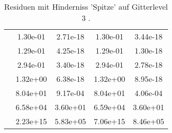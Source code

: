 \begin{table}
\begin{tabular}{c|cc|cc|}
\multicolumn{1}{|c|}{} & \multicolumn{1}{|c|}{  1.30e-01} & \multicolumn{1}{|c|}{  2.71e-18} & \multicolumn{1}{|c|}{  1.30e-01} & \multicolumn{1}{|c|}{  3.44e-18} \\ 
\multicolumn{1}{|c|}{} & \multicolumn{1}{|c|}{  1.29e-01} & \multicolumn{1}{|c|}{  4.25e-18} & \multicolumn{1}{|c|}{  1.29e-01} & \multicolumn{1}{|c|}{  1.30e-18} \\ 
\multicolumn{1}{|c|}{} & \multicolumn{1}{|c|}{  2.94e-01} & \multicolumn{1}{|c|}{  3.40e-18} & \multicolumn{1}{|c|}{  2.94e-01} & \multicolumn{1}{|c|}{  2.78e-18} \\ 
\multicolumn{1}{|c|}{} & \multicolumn{1}{|c|}{  1.32e+00} & \multicolumn{1}{|c|}{  6.38e-18} & \multicolumn{1}{|c|}{  1.32e+00} & \multicolumn{1}{|c|}{  8.95e-18} \\ 
\multicolumn{1}{|c|}{} & \multicolumn{1}{|c|}{  8.04e+01} & \multicolumn{1}{|c|}{  9.17e-04} & \multicolumn{1}{|c|}{  8.04e+01} & \multicolumn{1}{|c|}{  4.06e-04} \\ 
\multicolumn{1}{|c|}{} & \multicolumn{1}{|c|}{  6.58e+04} & \multicolumn{1}{|c|}{  3.60e+01} & \multicolumn{1}{|c|}{  6.59e+04} & \multicolumn{1}{|c|}{  3.60e+01} \\ 
\multicolumn{1}{|c|}{} & \multicolumn{1}{|c|}{  2.23e+15} & \multicolumn{1}{|c|}{  5.83e+05} & \multicolumn{1}{|c|}{  7.06e+15} & \multicolumn{1}{|c|}{  8.46e+05} \\ 
\hline 
\end{tabular}\caption{Residuen mit Hinderniss 'Spitze' auf Gitterlevel 3 .}\label{tab:Residuum_Spitze_level3}
\end{table} 
